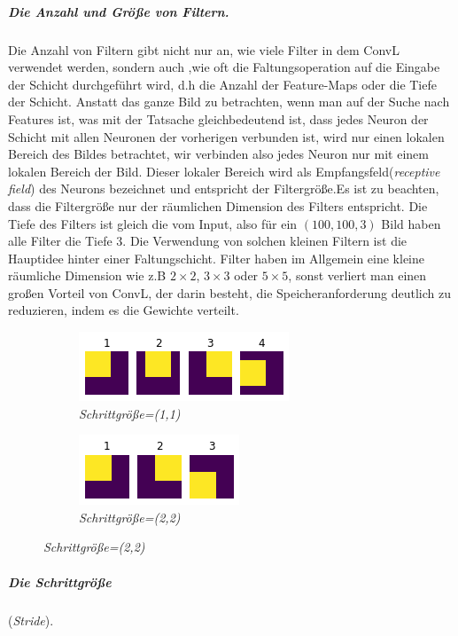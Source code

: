\documentclass[12pt,a4paper]{scrartcl}
\numberwithin{equation}{section}
\begin{document}
\subparagraph{Die Anzahl und Größe von Filtern.}
	Die Anzahl von Filtern gibt nicht nur an, wie viele Filter in dem \ac{ConvL} verwendet werden, sondern auch ,wie oft die Faltungsoperation auf die Eingabe der Schicht durchgeführt wird, d.h die Anzahl der Feature-Maps oder die Tiefe der Schicht.
	Anstatt das ganze Bild zu betrachten, wenn man auf der Suche nach Features ist, was mit der Tatsache gleichbedeutend ist, dass jedes Neuron der Schicht mit allen Neuronen der vorherigen verbunden ist, wird nur einen lokalen Bereich des Bildes betrachtet, wir verbinden also jedes Neuron nur mit einem lokalen Bereich der Bild. Dieser lokaler Bereich wird als Empfangsfeld(\emph{receptive field}) des Neurons bezeichnet und entspricht der Filtergröße.Es ist zu beachten, dass die Filtergröße nur der räumlichen Dimension des Filters entspricht. Die Tiefe des Filters ist gleich die vom Input, also für ein $ (100, 100, 3) $ Bild haben alle Filter die Tiefe $ 3 $.	
	Die Verwendung von solchen kleinen Filtern ist die Hauptidee hinter einer Faltungschicht. Filter haben im Allgemein eine kleine räumliche Dimension wie z.B $ 2\times 2 $, $3 \times3 $  oder  $5 \times 5$, sonst verliert man einen großen Vorteil von \ac{ConvL}, der darin besteht, die Speicheranforderung deutlich zu reduzieren, indem es die Gewichte verteilt. 
	
	\begin{figure}[h]
		\centering
		\caption{Einfluss der Schrittgröße auf die Größe der Feature-Maps}
		\begin{subfigure}{.5\textwidth}
			\centering
			\includegraphics{stride1}
			\caption{\emph{Schrittgröße=(1,1) } }
			\label{fig:stride1}
		\end{subfigure}%
		\begin{subfigure}{.5\textwidth}
			\centering
			\includegraphics{stride2}
			\caption{ \emph{Schrittgröße=(2,2) } }
			\label{fig:stride2}
		\end{subfigure}
	\end{figure}
\subparagraph{Die Schrittgröße}(\emph{Stride}).
	
\end{document}
